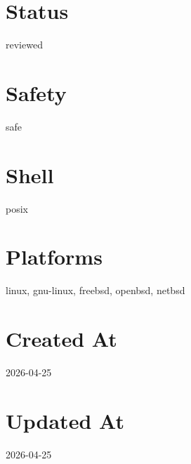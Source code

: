 \documentclass{article}
\begin{document}
\section*{Status}
reviewed

\section*{Safety}
safe

\section*{Shell}
posix

\section*{Platforms}
linux, gnu-linux, freebsd, openbsd, netbsd

\section*{Created At}
2026-04-25

\section*{Updated At}
2026-04-25
\end{document}
